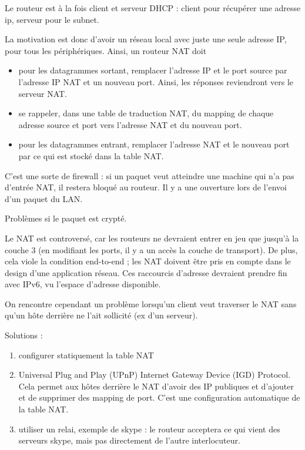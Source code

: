 		Le routeur est à la fois client et serveur DHCP : client pour récupérer une adresse ip, serveur pour le subnet.
	
		
	La motivation est donc d'avoir un réseau local avec juste une seule adresse IP, pour tous les périphériques. Ainsi, un routeur NAT doit
	
	\begin{itemize}
		\item pour les datagrammes sortant, remplacer l'adresse IP et le port source par l'adresse IP NAT et un nouveau port. Ainsi, les réponses reviendront vers le serveur NAT.
		\item se rappeler, dans une table de traduction NAT, du mapping de chaque adresse source et port vers l'adresse NAT et du nouveau port.
		\item pour les datagrammes entrant, remplacer l'adresse NAT et le nouveau port par ce qui est stocké dans la table NAT.
	\end{itemize}
		
		C'est une sorte de firewall : si un paquet veut atteindre une machine qui n'a pas d'entrée NAT, il restera bloqué au routeur. Il y a une ouverture lors de l'envoi d'un paquet du LAN.
	
		Problèmes si le paquet est crypté.
		
		Le NAT est controversé, car les routeurs ne devraient entrer en jeu que jusqu'à la couche 3 (en modifiant les ports, il y a un accès  la couche de transport). De plus, cela viole la condition end-to-end ; les NAT doivent être pris en compte dans le design d'une application réseau. Ces raccourcis d'adresse devraient prendre fin avec IPv6, vu l'espace d'adresse disponible.
		
		On rencontre cependant un problème lorsqu'un client veut traverser le NAT sans qu'un hôte derrière ne l'ait sollicité (ex d'un serveur).
		
		Solutions : 
		
		\begin{enumerate}
			\item configurer statiquement la table NAT
			\item Universal Plug and Play (UPnP) Internet Gateway Device (IGD) Protocol. Cela permet aux hôtes derrière le NAT d'avoir des IP publiques et d'ajouter et de supprimer des mapping de port. C'est une configuration automatique de la table NAT.				
			
			
			\item utiliser un relai, exemple de skype : le routeur acceptera ce qui vient des serveurs skype, mais pas directement de l'autre interlocuteur.
			
		\end{enumerate}
	
